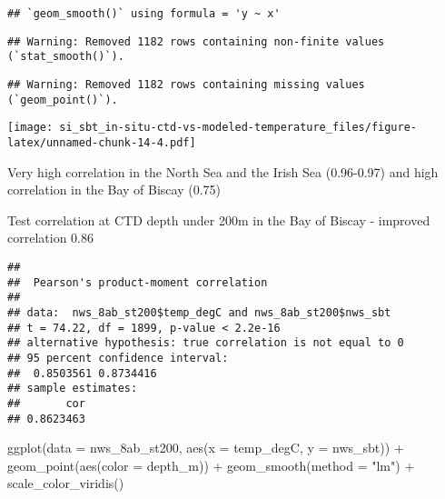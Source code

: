 \documentclass[
]{article}
\newenvironment{Shaded}{\begin{snugshade}}{\end{snugshade}}
\newcommand{\AttributeTok}[1]{\textcolor[rgb]{0.77,0.63,0.00}{#1}}
\newcommand{\CommentTok}[1]{\textcolor[rgb]{0.56,0.35,0.01}{\textit{#1}}}
\newcommand{\DecValTok}[1]{\textcolor[rgb]{0.00,0.00,0.81}{#1}}
\newcommand{\FunctionTok}[1]{\textcolor[rgb]{0.00,0.00,0.00}{#1}}
\newcommand{\NormalTok}[1]{#1}
\newcommand{\OtherTok}[1]{\textcolor[rgb]{0.56,0.35,0.01}{#1}}
\newcommand{\SpecialCharTok}[1]{\textcolor[rgb]{0.00,0.00,0.00}{#1}}
\newcommand{\StringTok}[1]{\textcolor[rgb]{0.31,0.60,0.02}{#1}}
\begin{document}
\begin{verbatim}
## `geom_smooth()` using formula = 'y ~ x'
\end{verbatim}

\begin{verbatim}
## Warning: Removed 1182 rows containing non-finite values (`stat_smooth()`).
\end{verbatim}

\begin{verbatim}
## Warning: Removed 1182 rows containing missing values (`geom_point()`).
\end{verbatim}

\texttt{[image: si\_sbt\_in-situ-ctd-vs-modeled-temperature\_files/figure-latex/unnamed-chunk-14-4.pdf]}

Very high correlation in the North Sea and the Irish Sea (0.96-0.97) and
high correlation in the Bay of Biscay (0.75)

Test correlation at CTD depth under 200m in the Bay of Biscay - improved
correlation 0.86

\begin{Shaded}
\end{Shaded}

\begin{verbatim}
## 
##  Pearson's product-moment correlation
## 
## data:  nws_8ab_st200$temp_degC and nws_8ab_st200$nws_sbt
## t = 74.22, df = 1899, p-value < 2.2e-16
## alternative hypothesis: true correlation is not equal to 0
## 95 percent confidence interval:
##  0.8503561 0.8734416
## sample estimates:
##       cor 
## 0.8623463
\end{verbatim}

\begin{Shaded}
\begin{Highlighting}[]
\FunctionTok{ggplot}\NormalTok{(}\AttributeTok{data =}\NormalTok{ nws\_8ab\_st200, }\FunctionTok{aes}\NormalTok{(}\AttributeTok{x =}\NormalTok{ temp\_degC, }\AttributeTok{y =}\NormalTok{ nws\_sbt)) }\SpecialCharTok{+} \FunctionTok{geom\_point}\NormalTok{(}\FunctionTok{aes}\NormalTok{(}\AttributeTok{color =}\NormalTok{ depth\_m)) }\SpecialCharTok{+} \FunctionTok{geom\_smooth}\NormalTok{(}\AttributeTok{method =} \StringTok{"lm"}\NormalTok{) }\SpecialCharTok{+} \FunctionTok{scale\_color\_viridis}\NormalTok{()}
\end{Highlighting}
\end{Shaded}
\end{document}
